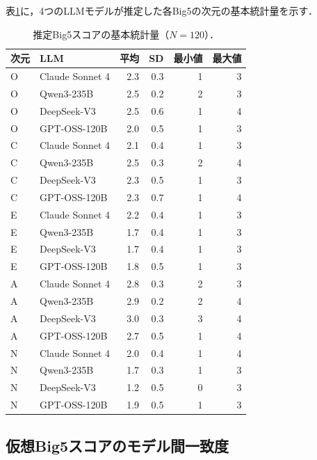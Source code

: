 \documentclass[dvipdfmx,11pt,a4paper]{bxjsarticle}
\renewcommand{\_}{\paperorigunderscore\allowbreak}%
\begin{document}
表\ref{tab:score_stats}に，4つのLLMモデルが推定した各Big5の次元の基本統計量を示す．


\begin{table}[htbp]
\centering
\caption{推定Big5スコアの基本統計量（$N = 120$）．}
\label{tab:score_stats}
\begin{tabular}{llrrrr}
\toprule
次元 & LLM & 平均 & SD & 最小値 & 最大値 \\
\midrule
O & Claude Sonnet 4       & 2.3 & 0.3 & 1 & 3 \\
O & Qwen3-235B    & 2.5 & 0.2 & 2 & 3 \\
O & DeepSeek-V3   & 2.5 & 0.6 & 1 & 4 \\
O & GPT-OSS-120B  & 2.0 & 0.5 & 1 & 3 \\
\midrule
C & Claude Sonnet 4       & 2.1 & 0.4 & 1 & 3 \\
C & Qwen3-235B    & 2.5 & 0.3 & 2 & 4 \\
C & DeepSeek-V3   & 2.3 & 0.5 & 1 & 3 \\
C & GPT-OSS-120B  & 2.3 & 0.7 & 1 & 4 \\
\midrule
E & Claude Sonnet 4       & 2.2 & 0.4 & 1 & 3 \\
E & Qwen3-235B    & 1.7 & 0.4 & 1 & 3 \\
E & DeepSeek-V3   & 1.7 & 0.4 & 1 & 3 \\
E & GPT-OSS-120B  & 1.8 & 0.5 & 1 & 3 \\
\midrule
A & Claude Sonnet 4       & 2.8 & 0.3 & 2 & 3 \\
A & Qwen3-235B    & 2.9 & 0.2 & 2 & 4 \\
A & DeepSeek-V3   & 3.0 & 0.3 & 3 & 4 \\
A & GPT-OSS-120B  & 2.7 & 0.5 & 1 & 4 \\
\midrule
N & Claude Sonnet 4       & 2.0 & 0.4 & 1 & 4 \\
N & Qwen3-235B    & 1.7 & 0.3 & 1 & 3 \\
N & DeepSeek-V3   & 1.2 & 0.5 & 0 & 3 \\
N & GPT-OSS-120B  & 1.9 & 0.5 & 1 & 3 \\
\bottomrule
\end{tabular}
\end{table}


\subsection{仮想Big5スコアのモデル間一致度}
\label{sec:appendix_teacher_agreement}
\end{document}
